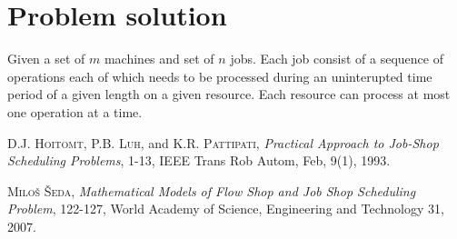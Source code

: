 \documentclass[a4paper,journal,onecolumn]{IEEEtran}
\begin{document}
\section{Problem solution}
Given a set of $m$ machines and set of $n$ jobs. Each job consist of a sequence of operations each of which needs 
to be processed during an uninterupted time period of a given length on a given resource. 
Each resource can process at most one operation at a time.


\begin{thebibliography}{1}

 \textsc{D.J. Hoitomt}, \textsc{P.B. Luh}, and \textsc{K.R. Pattipati}, \emph{Practical Approach to Job-Shop Scheduling
Problems}, 1-13, IEEE Trans Rob Autom, Feb, 9(1), 1993.

 \textsc{Miloš Šeda}, \emph{Mathematical Models of Flow Shop and Job Shop Scheduling Problem}, 122-127, World Academy of Science, Engineering and Technology 31, 2007.


\end{thebibliography}

\end{document}
